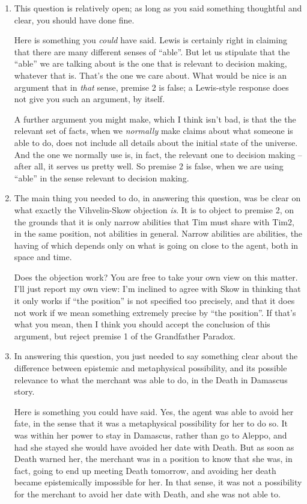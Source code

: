 \documentclass[12pt,a4paper]{article}
\begin{document}
\begin{enumerate}
\item This question is relatively open; as long as you said something thoughtful and clear, you should have done fine.

Here is something you \emph{could} have said. Lewis is certainly right in claiming that there are many different senses of ``able''. But let us stipulate that the ``able'' we are talking about is the one that is relevant to decision making, whatever that is. That's the one we care about. What would be nice is an argument that in \emph{that} sense, premise 2 is false; a Lewis-style response does not give you such an argument, by itself.

A further argument you might make, which I think isn't bad, is that the the relevant set of facts, when we \emph{normally} make claims about what someone is able to do, does not include all details about the initial state of the universe. And the one we normally use is, in fact, the relevant one to decision making -- after all, it serves us pretty well. So premise 2 is false, when we are using ``able'' in the sense relevant to decision making.

\item The main thing you needed to do, in answering this question, was be clear on what exactly the Vihvelin-Skow objection \emph{is}. It is to object to premise 2, on the grounds that it is only narrow abilities that Tim must share with Tim2, in the same position, not abilities in general. Narrow abilities are abilities, the having of which depends only on what is going on close to the agent, both in space and time. 

Does the objection work? You are free to take your own view on this matter. I'll just report my own view: I'm inclined to agree with Skow in thinking that it only works if ``the position'' is not specified too precisely, and that it does not work if we mean something extremely precise by ``the position''. If that's what you mean, then I think you should accept the conclusion of this argument, but reject premise 1 of the Grandfather Paradox.

\item In answering this question, you just needed to say something clear about the difference between epistemic and metaphysical possibility, and its possible relevance to what the merchant was able to do, in the Death in Damascus story.

Here is something you could have said. Yes, the agent was able to avoid her fate, in the sense that it was a metaphysical possibility for her to do so. It was within her power to stay in Damascus, rather than go to Aleppo, and had she stayed she would have avoided her date with Death. But as soon as Death warned her, the merchant was in a position to know that she was, in fact, going to end up meeting Death tomorrow, and avoiding her death became epistemically impossible for her. In that sense, it was not a possibility for the merchant to avoid her date with Death, and she was not able to.

\end{enumerate}
\end{document}
